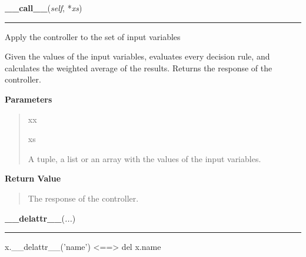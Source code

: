     \label{peach:fuzzy:control:Parametric:__call__}

    \vspace{0.5ex}

    \begin{boxedminipage}{\textwidth}

    \raggedright \textbf{\_\_call\_\_}(\textit{self}, *\textit{xs})

    \vspace{-1.5ex}

    \rule{\textwidth}{0.5\fboxrule}

Apply the controller to the set of input variables

Given the values of the input variables, evaluates every decision rule,
and calculates the weighted average of the results. Returns the response
of the controller.
    \vspace{1ex}

      \textbf{Parameters}
      \begin{quote}
        \begin{Ventry}{xx}

          \item[xs]


A tuple, a list or an array with the values of the input variables.
        \end{Ventry}

      \end{quote}

    \vspace{1ex}

      \textbf{Return Value}
      \begin{quote}

The response of the controller.
      \end{quote}

    \vspace{1ex}

    \end{boxedminipage}

    \label{object:__delattr__}

    \vspace{0.5ex}

    \begin{boxedminipage}{\textwidth}

    \raggedright \textbf{\_\_delattr\_\_}(\textit{...})

    \vspace{-1.5ex}

    \rule{\textwidth}{0.5\fboxrule}

x.{\_}{\_}delattr{\_}{\_}('name') {\textless}=={\textgreater} del x.name
    \vspace{1ex}

    \end{boxedminipage}

